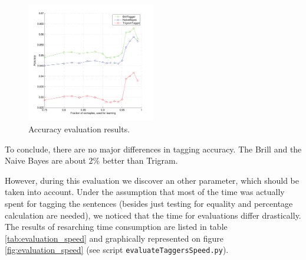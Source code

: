 \documentclass[10pt, conference, compsocconf]{IEEEtran}
\begin{document}
\begin{figure}[h]
\begin{center}
\includegraphics[width=0.5\textwidth]{../evaluation/graph.pdf} 
\end{center}
\caption{Accuracy evaluation results.}
\label{fig:evaluation}
\end{figure}
\par
To conclude, there are no major differences in tagging accuracy. The Brill and the Naive Bayes are about 2\% better than Trigram.
\par
However, during this evaluation we discover an other parameter, which should be taken into account.
Under the assumption that most of the time was actually spent for tagging the sentences (besides just testing for equality and percentage calculation are needed), we noticed that the time for evaluations differ drastically.
The results of resarching time consumption are listed in table \ref{tab:evaluation_speed} and graphically represented on figure \ref{fig:evaluation_speed} (see script \texttt{evaluateTaggersSpeed.py}).
\end{document}

